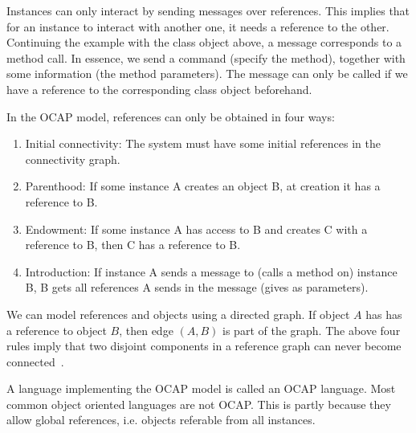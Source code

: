 Instances can only interact by sending messages over references. This implies
that for an instance to interact with another one, it needs a reference to the
other. Continuing the example with the class object above, a message corresponds
to a method call. In essence, we send a command (specify the
method), together with some information (the method parameters). The message can
only be called if we have a reference to the corresponding class object
beforehand.

In the OCAP model, references can only be obtained in four ways:
\begin{enumerate}
  \item Initial connectivity: The system must have some initial references in
    the connectivity graph.
  \item Parenthood: If some instance A creates an object B, at creation it has
    a reference to B.
  \item Endowment: If some instance A has access to B and creates C with a
    reference to B, then C has a reference to B.
  \item Introduction: If instance A sends a message to (calls a method on)
    instance B, B gets all references A sends in the message (gives as
    parameters).
\end{enumerate}
We can model references and objects using a directed graph. If object $A$ has
has a reference to object $B$, then edge $(A, B)$ is part of the graph. The
above four rules imply that two disjoint components in a reference graph can
never become connected~\parencite{Miller06b}.

A language implementing the OCAP model is called an OCAP language. Most common
object oriented languages are not OCAP. This is partly because they allow global
references, i.e. objects referable from all instances.
